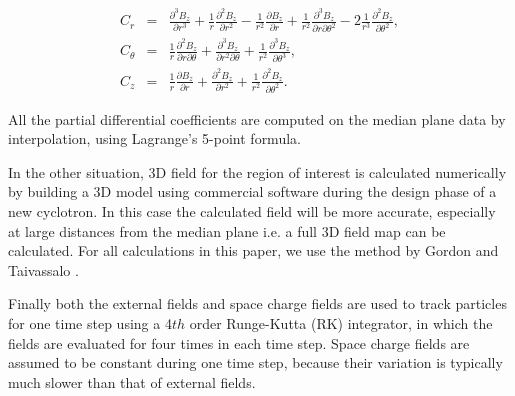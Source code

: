 \documentclass[aps,prstab,onecolumn,superscriptaddress,showpacs]{revtex4}
\begin{document}
\begin{eqnarray}\label{eq:Bcoeff}
  C_r & = & \frac{\partial^3B_z}{\partial r^3} + \frac{1}{r}\frac{\partial^2 B_z}{\partial r^2} - \frac{1}{r^2}\frac{\partial B_z}{\partial r} 
        + \frac{1}{r^2}\frac{\partial^3 B_z}{\partial r \partial \theta^2} - 2\frac{1}{r^3}\frac{\partial^2 B_z}{\partial \theta^2}, \nonumber  \\    
  C_{\theta} & = & \frac{1}{r}\frac{\partial^2 B_z}{\partial r \partial \theta} + \frac{\partial^3 B_z}{\partial r^2 \partial \theta}
        + \frac{1}{r^2}\frac{\partial^3 B_z}{\partial \theta^3},  \\
  C_z & = & \frac{1}{r}\frac{\partial B_z}{\partial r} + \frac{\partial^2 B_z}{\partial r^2} + \frac{1}{r^2}\frac{\partial^2 B_z}{\partial \theta^2}. \nonumber
\end{eqnarray}

All the partial differential coefficients are computed on the median plane data by interpolation, using Lagrange's 5-point formula.

In the other situation, 3D field for the region of interest is calculated numerically by building a 3D model using commercial software 
during the design phase of a new cyclotron. In this case the calculated field will be more accurate, especially at large distances from the median plane i.e. a
full 3D field map can be calculated. For all calculations in this paper, we use the method by Gordon and Taivassalo \cite{Gordon:2}.

Finally both the external fields and space charge fields are used to track particles for one time step using a 4$th$ order Runge-Kutta (RK) integrator, in which 
the fields are evaluated for four times in each time step. Space charge fields are assumed to be constant during one time step,
because their variation is typically much slower than that of external fields. 
    
\end{document}
